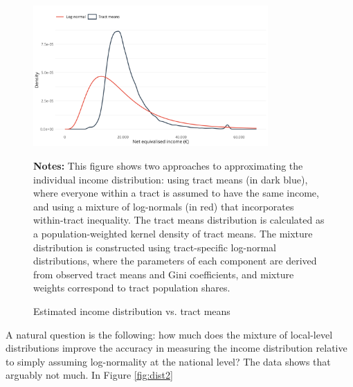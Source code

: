 \begin{figure}[H]
\begin{center}
\captionsetup{justification=centering}
\caption{Estimated income distribution vs. tract means}
\label{fig:distributions}
\includegraphics[width=0.8\textwidth]{output/tract_vs_individual_income_distribution.png}
\end{center}
\begin{fignotes2}
\textbf{Notes:} This figure shows two approaches to approximating the individual income distribution: using tract means (in dark blue), where everyone within a tract is assumed to have the same income, and using a mixture of log-normals (in red) that incorporates within-tract inequality. The tract means distribution is calculated as a population-weighted kernel density of tract means. The mixture distribution is constructed using tract-specific log-normal distributions, where the parameters of each component are derived from observed tract means and Gini coefficients, and mixture weights correspond to tract population shares.
\end{fignotes2}
\end{figure}

A natural question is the following: how much does the mixture of local-level distributions improve the accuracy in measuring the income distribution relative to simply assuming log-normality at the national level? The data shows that arguably not much. In Figure \ref{fig:dist2}


